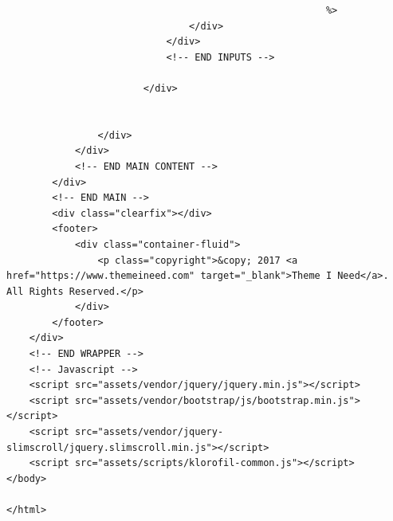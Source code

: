 \begin{lstlisting}
                                                        %>
								</div>
							</div>
							<!-- END INPUTS -->
							
						</div>
						
					
				</div>
			</div>
			<!-- END MAIN CONTENT -->
		</div>
		<!-- END MAIN -->
		<div class="clearfix"></div>
		<footer>
			<div class="container-fluid">
				<p class="copyright">&copy; 2017 <a href="https://www.themeineed.com" target="_blank">Theme I Need</a>. All Rights Reserved.</p>
			</div>
		</footer>
	</div>
	<!-- END WRAPPER -->
	<!-- Javascript -->
	<script src="assets/vendor/jquery/jquery.min.js"></script>
	<script src="assets/vendor/bootstrap/js/bootstrap.min.js"></script>
	<script src="assets/vendor/jquery-slimscroll/jquery.slimscroll.min.js"></script>
	<script src="assets/scripts/klorofil-common.js"></script>
</body>

</html>

\end{lstlisting}

